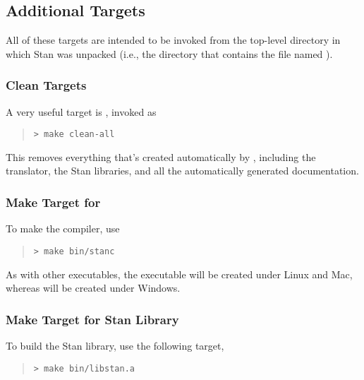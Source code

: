 \subsection{Additional   Targets}

All of these targets are intended to be invoked from the top-level
directory in which Stan was unpacked (i.e., the directory that
contains the file named ).

\subsubsection{Clean Targets}

A very useful target is , invoked as
%
\begin{quote}
\begin{Verbatim}[fontshape=sl,fontsize=\small]
> make clean-all
\end{Verbatim}
\end{quote}
%
This removes everything that's created automatically by ,
including the  translator, the Stan libraries, and all the
automatically generated documentation.  

\subsubsection{Make Target for }

To make the  compiler, use
%
\begin{quote}
\begin{Verbatim}[fontshape=sl,fontsize=\small]
> make bin/stanc
\end{Verbatim}
\end{quote}
%
As with other executables, the executable  will be
created under Linux and Mac, whereas  will be
created under Windows.

\subsubsection{Make Target for Stan Library}

To build the Stan library, use the following target,
%
\begin{quote}
\begin{Verbatim}[fontshape=sl,fontsize=\small]
> make bin/libstan.a
\end{Verbatim}
\end{quote}



